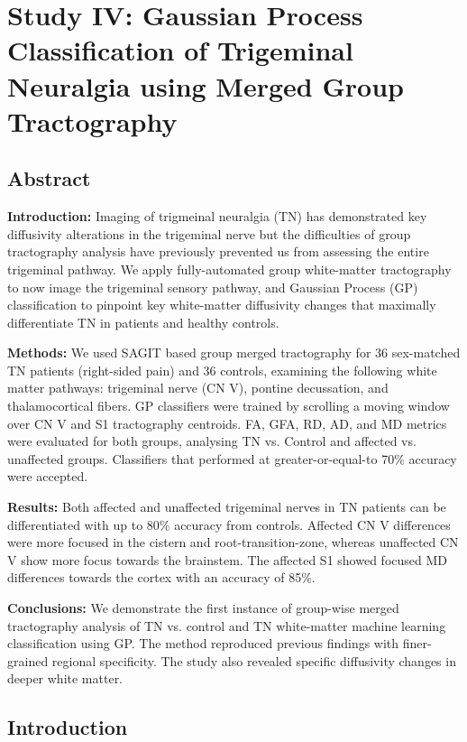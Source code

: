 \graphicspath{{images/tn-gp-sagit/drafts/}}

\chapter{Study IV: Gaussian Process Classification of Trigeminal Neuralgia using Merged Group Tractography}
\label{section:study4}

\section{Abstract}
\textbf{Introduction:}  Imaging of trigmeinal neuralgia (TN) has demonstrated key diffusivity alterations in the trigeminal nerve but the difficulties of group tractography analysis have previously prevented us from assessing the entire trigeminal pathway. We apply fully-automated group white-matter tractography to now image the trigeminal sensory pathway, and Gaussian Process (GP) classification to pinpoint key white-matter diffusivity changes that maximally differentiate TN in patients and healthy controls. 

\textbf{Methods:} We used SAGIT based group merged tractography for 36 sex-matched TN patients (right-sided pain) and 36 controls, examining the following white matter pathways: trigeminal nerve (CN V), pontine decussation, and thalamocortical fibers. GP classifiers were trained by scrolling a moving window over CN V and S1 tractography centroids. FA, GFA, RD, AD, and MD metrics were evaluated for both groups, analysing TN vs. Control and affected vs. unaffected groups. Classifiers that performed at greater-or-equal-to 70\% accuracy were accepted.

\textbf{Results:} Both affected and unaffected trigeminal nerves in TN patients can be differentiated with up to 80\% accuracy from controls. Affected CN V differences were more focused in the cistern and root-transition-zone, whereas unaffected CN V show more focus towards the brainstem. The affected S1 showed focused MD differences towards the cortex with an accuracy of 85\%. 

\textbf{Conclusions:} We  demonstrate the first instance of group-wise merged tractography analysis of TN vs. control and TN white-matter machine learning classification using GP. The method reproduced previous findings with finer-grained regional specificity. The study also revealed specific diffusivity changes in deeper white matter.

\section{Introduction}
